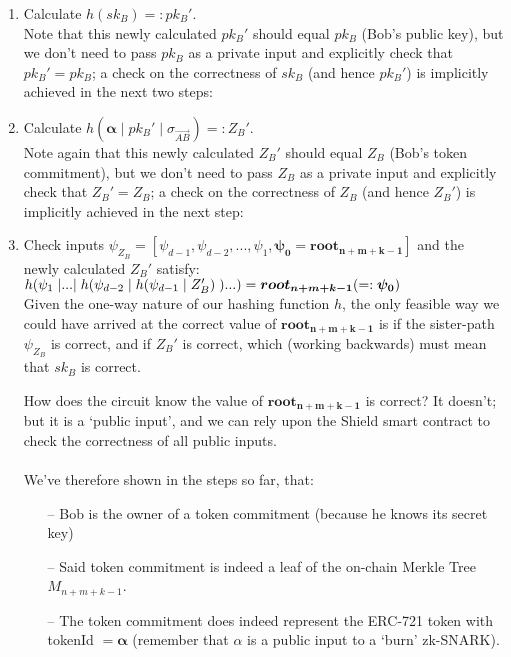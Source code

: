 \documentclass{article}
\DeclarePairedDelimiter\br{(}{)}
\begin{document}
\begin{enumerate}
  \item Calculate $h(sk_B) =: pk_B'$.\\
    Note that this newly calculated $pk_B'$ should equal $pk_B$ (Bob's public key), but we don't need to pass $pk_B$ as a private input and explicitly check that $pk_B'=pk_B$; a check on the correctness of $sk_B$ (and hence $pk_B'$) is implicitly achieved in the next two steps:
  \item Calculate $h(\bm{\alpha}\;|\;pk_B'\;|\;\sigma_{\vec{AB}}) =: Z_B'$.\\
    Note again that this newly calculated $Z_B'$ should equal $Z_B$ (Bob's token commitment), but we don't need to pass $Z_B$ as a private input and explicitly check that $Z_B'=Z_B$; a check on the correctness of $Z_B$ (and hence $Z_B'$) is implicitly achieved in the next step:
  \item Check inputs $\psi_{Z_B}=[\psi_{d-1}, \psi_{d-2},..., \psi_{1}, \bm{\psi_{0}=root_{n+m+k-1}}]$ and the newly calculated $Z_B'$ satisfy:\\
    $h\br*{\psi_{1}\;|...|\;h\br*{\psi_{d-2}\;|\;h\br*{\psi_{d-1}\;|\;Z_B'}\;}...} = \bm{root_{n+m+k-1}} ( =: \bm{\psi_{0}})$\\
    Given the one-way nature of our hashing function $h$, the only feasible way we could have arrived at the correct value of $\bm{root_{n+m+k-1}}$ is if the sister-path $\psi_{Z_B}$ is correct, and if $Z_B'$ is correct, which (working backwards) must mean that $sk_B$ is correct.

    How does the circuit know the value of $\bm{root_{n+m+k-1}}$ is correct? It doesn't; but it is a `public input', and we can rely upon the Shield smart contract to check the correctness of all public inputs.\\
  \\
  We've therefore shown in the steps so far, that:
  \begin{itemize}
    \item[--] Bob is the owner of a token commitment (because he knows its secret key)
    \item[--] Said token commitment is indeed a leaf of the on-chain Merkle Tree $M_{n+m+k-1}$.
    \item[--] The token commitment does indeed represent the ERC-721 token with tokenId $=\bm{\alpha}$ (remember that $\alpha$ is a public input to a `burn' zk-SNARK).
  \end{itemize}


\end{enumerate}
\end{document}
